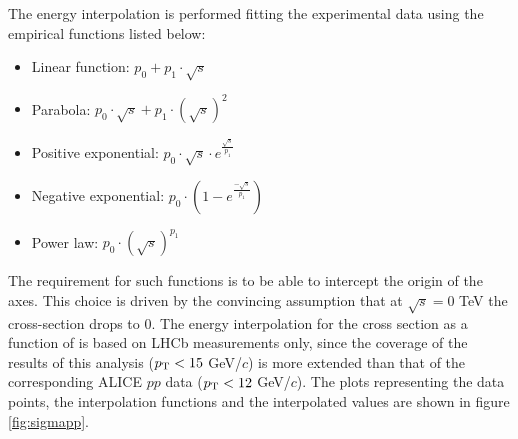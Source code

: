 The energy interpolation is performed fitting the experimental data using the empirical functions listed below:
\begin{itemize}
    \item Linear function: $p_0+p_1\cdot\sqrt{s}$
    \item Parabola: $p_0\cdot\sqrt{s}+p_1\cdot(\sqrt{s})^2$
    \item Positive exponential: $p_0\cdot\sqrt{s}\cdot e^{\frac{\sqrt{s}}{p_1}}$
    \item Negative exponential: $p_0\cdot(1-e^{\frac{-\sqrt{s}}{p_1}})$
    \item Power law: $p_0\cdot(\sqrt{s})^{p_1}$
\end{itemize}
The requirement for such functions is to be able to intercept the origin of the axes.
This choice is driven by the convincing assumption that at $\sqrt{s}=0$ \rm{TeV}  the cross-section drops to $0$.
The energy interpolation for the \upsis cross section as a function of \pt is based on LHCb measurements only, since the  \pt coverage of the results of this analysis ($p_{\rm T} < 15$ GeV/$c$) is more extended than that of the corresponding ALICE $pp$ data ($p_{\rm T} < 12$ GeV/$c$).
The plots representing the data points, the interpolation functions and the interpolated values are shown in figure \ref{fig:sigmapp}.

